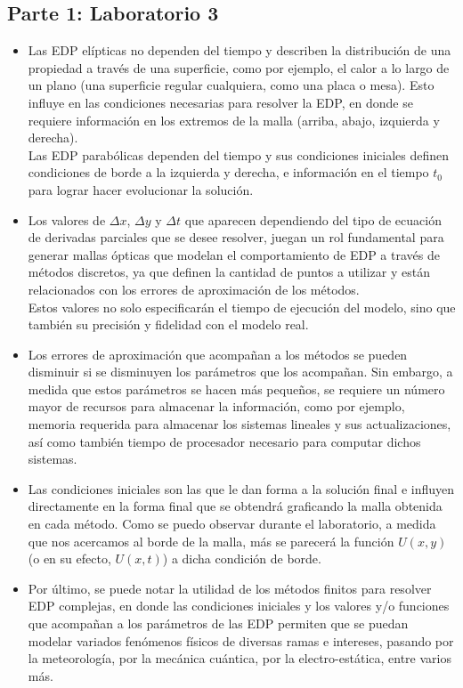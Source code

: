 \documentclass[letterpaper]{article}
\newcommand{\5}
{
\\[.5cm]
}
\begin{document}
\subsection{Parte 1: Laboratorio 3}
\begin{itemize}
\item Las EDP elípticas no dependen del tiempo y describen la distribución de una propiedad a través de una superficie, como por ejemplo, el calor a lo largo de un plano (una superficie regular cualquiera, como una placa o mesa). Esto influye en las condiciones necesarias para resolver la EDP, en donde se requiere información en los extremos de la malla (arriba, abajo, izquierda y derecha). \\
Las EDP parabólicas dependen del tiempo y sus condiciones iniciales definen condiciones de borde a la izquierda y derecha, e información en el tiempo $t_0$ para lograr hacer evolucionar la solución.
\item Los valores de $\Delta x$, $\Delta y$ y $\Delta t$ que aparecen dependiendo del tipo de ecuación de derivadas parciales que se desee resolver, juegan un rol fundamental para generar mallas ópticas que modelan el comportamiento de EDP a través de métodos discretos, ya que definen la cantidad de puntos a utilizar y están relacionados con los errores de aproximación de los métodos. \\
Estos valores no solo especificarán el tiempo de ejecución del modelo, sino que también su precisión y fidelidad con el modelo real.

\item Los errores de aproximación que acompañan a los métodos se pueden disminuir si se disminuyen los parámetros que los acompañan. Sin embargo, a medida que estos parámetros se hacen más pequeños, se requiere un número mayor de recursos para almacenar la información, como por ejemplo, memoria requerida para almacenar los sistemas lineales y sus actualizaciones, así como también tiempo de procesador necesario para computar dichos sistemas.

\item Las condiciones iniciales son las que le dan forma a la solución final e influyen directamente en la forma final que se obtendrá graficando la malla obtenida en cada método. Como se puedo observar durante el laboratorio, a medida que nos acercamos al borde de la malla, más se parecerá la función $U(x, y)$ (o en su efecto, $U(x, t)$) a dicha condición de borde.

\item Por último, se puede notar la utilidad de los métodos finitos para resolver EDP complejas, en donde las condiciones iniciales y los valores y/o funciones que acompañan a los parámetros de las EDP permiten que se puedan modelar variados fenómenos físicos de diversas ramas e intereses, pasando por la meteorología, por la mecánica cuántica, por la electro-estática, entre varios más.
\end{itemize}
\end{document}
